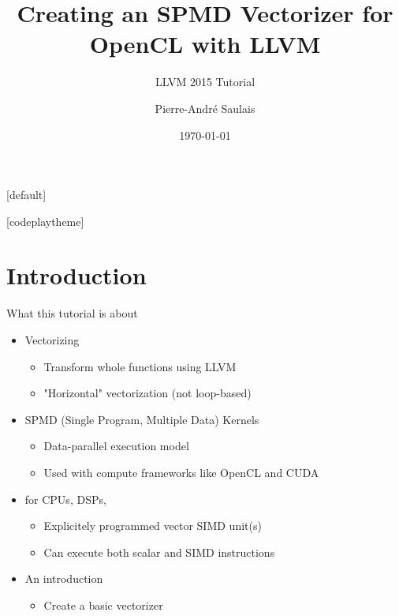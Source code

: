 \documentclass[t,aspectratio=169]{beamer}
\title{Creating an SPMD Vectorizer for OpenCL with LLVM}
\subtitle{LLVM 2015 Tutorial}
\author{Pierre-André Saulais}
\institute{Codeplay Software \\ @codeplaysoft}
\date{\today}
\begin{document}
[default]

\begin{frame}
  \vspace{4ex}
  \titlepage
\end{frame}


[codeplaytheme]

\section*{Introduction}

\begin{frame}{What this tutorial is about}


\begin{itemize}  
    \item Vectorizing
    \begin{itemize}
        \item Transform whole functions using LLVM
        \item "Horizontal" vectorization (not loop-based)
    \end{itemize}  
    \item SPMD (Single Program, Multiple Data) Kernels
    \begin{itemize}
        \item Data-parallel execution model
        \item Used with compute frameworks like OpenCL and CUDA
    \end{itemize}
    \item for CPUs, DSPs,
    \begin{itemize}
        \item Explicitely programmed vector SIMD unit(s)
        \item Can execute both scalar and SIMD instructions
    \end{itemize}
    \item An introduction
    \begin{itemize}
        \item Create a basic vectorizer
    \end{itemize}
\end{itemize}

\end{frame}
\end{document}
